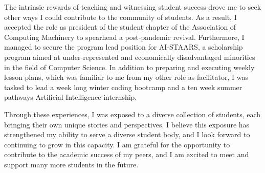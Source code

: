 \documentclass[12pt]{article}
\begin{document}
The intrinsic rewards of teaching and witnessing student success drove me to
seek other ways I could contribute to the community of students.  As a result, I
accepted the role as president of the student chapter of the Association of
Computing Machinery to spearhead a post-pandemic revival.  Furthermore, I managed to secure
the program lead position for AI-STAARS, a scholarship program aimed at under-represented and economically disadvantaged
minorities in the field of Computer Science.  In addition to preparing and
executing weekly lesson plans, which was familiar to me from my other role as
facilitator, I was tasked to lead a week long winter coding bootcamp and a ten week summer pathways Artificial Intelligence internship.

Through these experiences, I was exposed to a diverse collection of students, each bringing their own unique stories and perspectives.  I
believe this exposure has strengthened my ability to serve a diverse student body, and I look forward to continuing to grow in this
capacity. I am grateful for the opportunity to contribute to the academic success of my peers, and I am excited to meet and support many
more students in the future.
\end{document}
